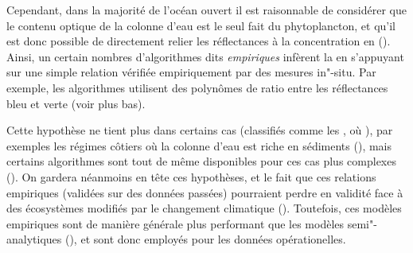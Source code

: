 Cependant, dans la majorité de l'océan ouvert il est raisonnable de considérer que le contenu optique de la colonne d'eau est le seul fait du phytoplancton\footnotemark, et qu'il est donc possible de directement relier les réflectances à la concentration en  (\cite{bailey_2006, brewin_2015a}).
Ainsi, un certain nombres d'algorithmes dits \emph{empiriques} infèrent la  en s'appuyant sur une simple relation vérifiée empiriquement par des mesures in"-situ.
Par exemple, les algorithmes  utilisent des polynômes de ratio entre les réflectances bleu et verte (voir plus bas).

Cette hypothèse ne tient plus dans certains cas (classifiés comme les , où ), par exemples les régimes côtiers où la colonne d'eau est riche en sédiments (\cite{bailey_2006, brewin_2015a}), mais certains algorithmes sont tout de même disponibles pour ces cas plus complexes (\cite{gohin_2002}).
On gardera néanmoins en tête ces hypothèses, et le fait que ces relations empiriques (validées sur des données passées) pourraient perdre en validité face à des écosystèmes modifiés par le changement climatique (\cite{dierssen_2010}).
Toutefois, ces modèles empiriques sont de manière générale plus performant que les modèles semi"-analytiques (\cite{brewin_2015a}), et sont donc employés pour les données opérationelles.

